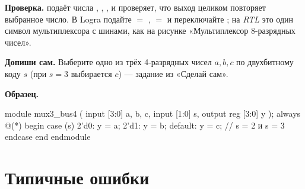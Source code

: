 \textbf{Проверка.}  подаёт числа , ,
,  и проверяет, что выход целиком повторяет выбранное
число. В Logra подайте  $=$ ,  $=$  и
переключайте ; на \emph{RTL} это один символ мультиплексора с шинами,
как на рисунке «Мультиплексор 8-разрядных чисел».

\textbf{Допиши сам.} Выберите одно из трёх 4-разрядных чисел $a,b,c$ по
двухбитному коду $s$ (при $s=3$ выбирается $c$) --- задание из «Сделай сам».

\textbf{Образец.}
\begin{vcode}
module mux3_bus4 (
    input  [3:0] a, b, c,
    input  [1:0] s,
    output reg [3:0] y
);
    always @(*) begin
        case (s)
            2'd0:    y = a;
            2'd1:    y = b;
            default: y = c;    // s = 2 и s = 3
        endcase
    end
endmodule
\end{vcode}

\section{Типичные ошибки}

